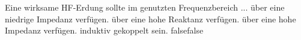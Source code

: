     {Eine wirksame HF-Erdung sollte im genutzten Frequenzbereich ...}
    {über eine niedrige Impedanz verfügen.}
    {über eine hohe Reaktanz verfügen.}
    {über eine hohe Impedanz verfügen.}
    {induktiv gekoppelt sein.}
    {false}{false}